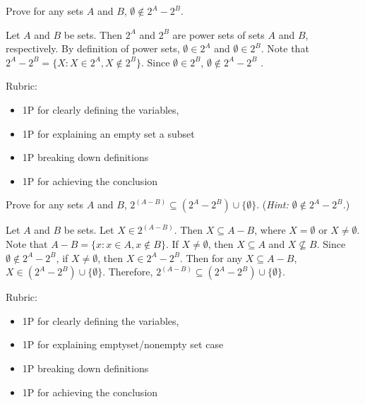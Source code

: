 \documentclass{article}
\theoremstyle{definition}
\begin{document}
\begin{question}{4}
   Prove for any sets $A$ and $B$, $\emptyset \notin 2^A - 2^B$.
\end{question}
\begin{solution}
Let $A$ and $B$ be sets. Then $2^A$ and $2^B$ are power sets of sets $A$ and $B$, respectively. By definition of power sets, $\emptyset \in 2^A$ and $\emptyset \in 2^B$. Note that $2^A - 2^B = \{ X: X\in 2^A, X\notin 2^B\}$. Since $\emptyset \in 2^B$, $\emptyset \notin 2^A-2^B$ .


{\color{red} Rubric:
\begin{itemize}
\item 1P for clearly defining the variables, 
\item 1P for explaining an empty set a subset
\item 1P breaking down definitions
\item 1P for achieving the conclusion
\end{itemize}}
\end{solution}

\begin{question}{4}
   Prove for any sets $A$ and $B$, $2^{(A-B)} \subseteq ( 2^A - 2^B) \cup \{\emptyset\}$. (\textit{Hint: $\emptyset \notin 2^A - 2^B$.})
\end{question}
\begin{solution}
Let $A$ and $B$ be sets. Let $X\in 2^{(A-B)}$. Then $X\subseteq A-B$, where $X=\emptyset$ or $X\neq \emptyset$. Note that $A-B=\{x : x\in A, x\notin B\}$. If $X\neq \emptyset$, then $X\subseteq A$ and $X\not\subseteq B$. Since $\emptyset \notin 2^A - 2^B$, if $X\neq \emptyset$, then $X\in 2^A-2^B$. Then for any $X\subseteq A-B$, $X\in (2^A-2^B)\cup \{\emptyset\}$. Therefore, $2^{(A-B)} \subseteq ( 2^A - 2^B) \cup \{\emptyset\}$.


{\color{red} Rubric:
\begin{itemize}
\item 1P for clearly defining the variables, 
\item 1P for explaining emptyset/nonempty set case
\item 1P breaking down definitions
\item 1P for achieving the conclusion
\end{itemize}}
\end{solution}
\end{document}

